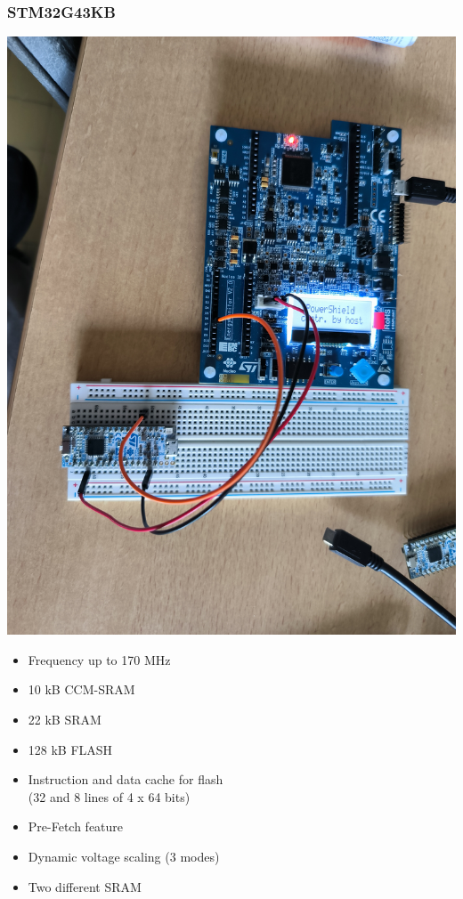 \documentclass[
	11pt, %
]{beamer}
\begin{document}
\begin{frame}
    \frametitle{STM32G43KB}
	\centering
    \begin{minipage}{0.4\textwidth}
		\includegraphics[scale = 0.04]{images/stm32g.jpg}
	\end{minipage}
	\begin{minipage}{0.50\textwidth}
		\centering
		\begin{itemize}
			\item Frequency up to 170 MHz 
			\item 10 kB CCM-SRAM
			\item 22 kB SRAM 
			\item 128 kB FLASH
			\item Instruction and data cache for flash \\ (32 and 8 lines of 4 x 64 bits) 
			\item Pre-Fetch feature
			\item Dynamic voltage scaling (3 modes)
			\item Two different SRAM
		\end{itemize}
		\end{minipage}
\end{frame}
\end{document}
